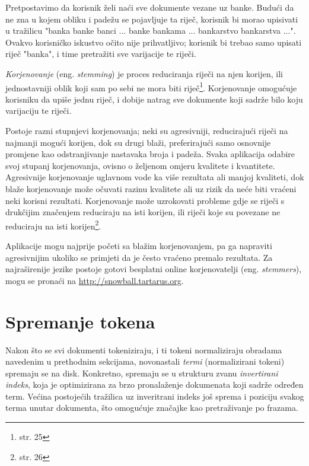 \documentclass[11pt]{scrreprt}
\begin{document}
Pretpostavimo da korisnik želi naći sve dokumente vezane uz banke. Budući da ne zna u kojem obliku i padežu se pojavljuje ta riječ, korisnik bi morao upisivati u tražilicu "banka banke banci ... banke bankama ... bankarstvo bankarstva ...". Ovakvo korisničko iskustvo očito nije prihvatljivo; korisnik bi trebao samo upisati riječ "banka", i time pretražiti sve varijacije te riječi.

\textit{Korjenovanje} (eng. \textit{stemming}) je proces reduciranja riječi na njen korijen, ili jednostavniji oblik koji sam po sebi ne mora biti riječ\footnote{\cite{taming} str. 25}. Korjenovanje omogućuje korisniku da upiše jednu riječ, i dobije natrag sve dokumente koji sadrže bilo koju varijaciju te riječi.

Postoje razni stupnjevi korjenovanja; neki su agresivniji, reducirajući riječi na najmanji mogući korijen, dok su drugi blaži, preferirajući samo osnovnije promjene kao odstranjivanje nastavaka broja i padeža. Svaka aplikacija odabire svoj stupanj korjenovanja, ovisno o željenom omjeru kvalitete i kvantitete. Agresivnije korjenovanje uglavnom vode ka više rezultata ali manjoj kvaliteti, dok blaže korjenovanje može očuvati razinu kvalitete ali uz rizik da neće biti vraćeni neki korisni rezultati. Korjenovanje može uzrokovati probleme gdje se riječi s drukčijim značenjem reduciraju na isti korijen, ili riječi koje su povezane ne reduciraju na isti korijen\footnote{\cite{taming} str. 26}.

Aplikacije mogu najprije početi sa blažim korjenovanjem, pa ga napraviti agresivnijim ukoliko se primjeti da je često vraćeno premalo rezultata. Za najraširenije jezike postoje gotovi besplatni online korjenovatelji (eng. \textit{stemmers}), mogu se pronaći na \url{http://snowball.tartarus.org}.

\section{Spremanje tokena}

Nakon što se svi dokumenti tokeniziraju, i ti tokeni normaliziraju obradama navedenim u prethodnim sekcijama, novonastali \textit{termi} (normalizirani tokeni) spremaju se na disk. Konkretno, spremaju se u strukturu zvanu \textit{invertirani indeks}, koja je optimizirana za brzo pronalaženje dokumenata koji sadrže određen term. Većina postojećih tražilica uz inveritrani indeks još sprema i poziciju svakog terma unutar dokumenta, što omogućuje značajke kao pretraživanje po frazama.
\end{document}
